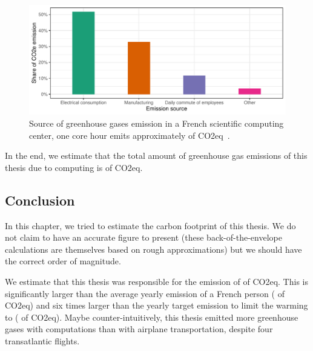         \begin{figure}[tpb]
            \centering
            \includegraphics[width=\linewidth]{img/appendix/carbon/co2_per_hour.pdf}
            \caption{Source of greenhouse gases emission in a French scientific computing center, one core hour emits
            approximately  of CO2eq~\cite{corehour_co2}.}%
            \label{fig:appendix:co2_per_hour}
        \end{figure}

        In the end, we estimate that the total amount of greenhouse gas emissions of this thesis due to computing is
         of CO2eq.

        \subsection*{Conclusion}

            In this chapter, we tried to estimate the carbon footprint of this thesis. We do not claim to have an
            accurate figure to present (these back-of-the-envelope calculations are themselves based on rough
            approximations) but we should have the correct order of magnitude.

            We estimate that this thesis was responsible for the emission of  of CO2eq. This is
            significantly larger than the average yearly emission of a French person ( of CO2eq) and six
            times larger than the yearly target emission to limit the warming to  ( of
            CO2eq). Maybe counter-intuitively, this thesis emitted more greenhouse gases with computations than with
            airplane transportation, despite four transatlantic flights.
